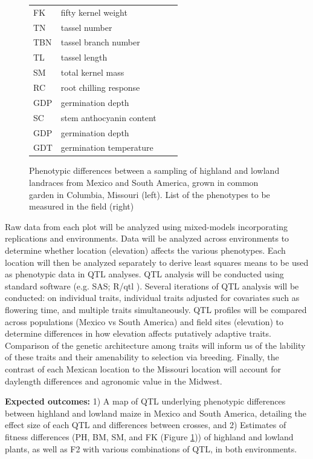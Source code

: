 \begin{figure}[ht!]
\begin{minipage}[c]{0.50\textwidth}
\begin{tabular}{llcc}
		FK & fifty kernel weight \\
		TN & tassel number \\
		TBN & tassel branch number \\
		TL & tassel length \\
		SM & total kernel mass \\
		RC & root chilling response \\
		GDP & germination depth \\
		SC & stem anthocyanin content \\
		GDP & germination depth \\
		GDT & germination temperature \\\bottomrule
		\end{tabular}
	\end{minipage}
 	\caption{ Phenotypic differences between a sampling of highland and lowland landraces from Mexico and South America, grown in common garden in Columbia, Missouri (left). List of the phenotypes to be measured in the field (right) }%
	\label{fig:phenos}
\end{figure}

Raw data from each plot will be analyzed using mixed-models incorporating replications and environments.  Data will be analyzed across environments to determine whether location (elevation) affects the various phenotypes.  Each location will then be analyzed separately to derive least squares means to be used as  phenotypic data in QTL analyses.  QTL analysis will be conducted using standard software (e.g. SAS; R/qtl \citealp{Broman2003a}).  Several iterations of QTL analysis will be conducted: on individual traits, individual traits adjusted for covariates such as flowering time, and multiple traits simultaneously.   QTL profiles will be compared across populations (Mexico vs South America) and field sites (elevation) to determine differences in how elevation affects putatively adaptive traits.  Comparison of the genetic architecture among traits will inform us of the lability of these traits and their amenability to selection via breeding.  Finally, the contrast of each Mexican location to the Missouri location will account for daylength differences and agronomic value in the Midwest. 

{\bf Expected outcomes:} 1) A map of QTL underlying phenotypic differences between highland and lowland maize in Mexico and South America, detailing the effect size of each QTL and differences between crosses, and 2) Estimates of fitness differences (PH, BM, SM, and FK (Figure \ref{fig:phenos})) of highland and lowland plants, as well as F2 with various combinations of QTL, in both environments. 

